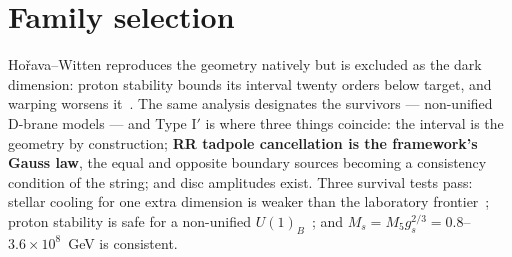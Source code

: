 \section{Family selection}
Ho\v{r}ava--Witten reproduces the geometry natively but is excluded as the dark dimension: proton stability bounds its interval twenty orders below target, and warping worsens it~\cite{ReigRuiz}. The same analysis designates the survivors --- non-unified D-brane models --- and Type I$'$ is where three things coincide: the interval is the geometry by construction; \textbf{RR tadpole cancellation is the framework's Gauss law}, the equal and opposite boundary sources becoming a consistency condition of the string; and disc amplitudes exist. Three survival tests pass: stellar cooling for one extra dimension is weaker than the laboratory frontier~\cite{Hardy}; proton stability is safe for a non-unified $U(1)_B$~\cite{Aldazabal}; and $M_s=M_5g_s^{2/3}=0.8$--$3.6\times10^8$~GeV is consistent.

